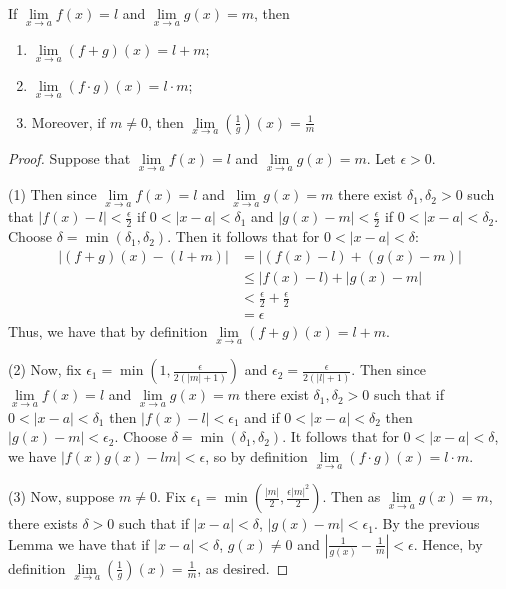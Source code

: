 \begin{thm}\label{thm:limlaws}
    If $\lim\limits_{x\rightarrow a}f(x) = l$ and $\lim\limits_{x\rightarrow a}g(x) = m$, then \begin{enumerate}
        \item $\lim\limits_{x\rightarrow a}(f+g)(x) = l+m$;
        \item $\lim\limits_{x\rightarrow a}(f\cdot g)(x) = l\cdot m$;
        \item Moreover, if $m \neq 0$, then $\lim\limits_{x\rightarrow a}\left(\frac{1}{g}\right)(x) = \frac{1}{m}$
    \end{enumerate}
\end{thm}
\begin{proof}
    Suppose that $\lim\limits_{x\rightarrow a}f(x) = l$ and $\lim\limits_{x\rightarrow a}g(x) = m$. Let $\epsilon > 0$.


    (1) Then since $\lim\limits_{x\rightarrow a}f(x) = l$ and $\lim\limits_{x\rightarrow a}g(x) = m$ there exist $\delta_1,\delta_2 > 0$ such that $|f(x) - l| < \frac{\epsilon}{2}$ if $0 < |x-a| < \delta_1$ and $|g(x) - m| < \frac{\epsilon}{2}$ if $0 < |x-a| < \delta_2$. Choose $\delta = \min(\delta_1,\delta_2)$. Then it follows that for $0 < |x-a| < \delta$: \begin{align*}
        |(f+g)(x) - (l+m)| &= |(f(x) - l) + (g(x) - m)| \\
        &\leq |f(x) - l) + |g(x) - m| \\
        &< \frac{\epsilon}{2} + \frac{\epsilon}{2} \\
        &= \epsilon
    \end{align*}
    Thus, we have that by definition $\lim\limits_{x\rightarrow a}(f+g)(x) = l+m$.


    (2) Now, fix $\epsilon_1 = \min\left(1,\frac{\epsilon}{2(|m|+1)}\right)$ and $\epsilon_2 = \frac{\epsilon}{2(|l| + 1)}$. Then since $\lim\limits_{x\rightarrow a}f(x) = l$ and $\lim\limits_{x\rightarrow a}g(x) = m$ there exist $\delta_1, \delta_2> 0$ such that if $0<|x-a| < \delta_1$ then $|f(x) - l| < \epsilon_1$ and if $0<|x-a| < \delta_2$ then $|g(x) - m| < \epsilon_2$. Choose $\delta = \min(\delta_1,\delta_2)$. It follows that for $0<|x-a| < \delta$, we have $|f(x)g(x) - lm| < \epsilon$, so by definition $\lim\limits_{x\rightarrow a}(f\cdot g)(x) = l\cdot m$.



    (3) Now, suppose $m \neq 0$. Fix $\epsilon_1 = \min\left(\frac{|m|}{2},\frac{\epsilon|m|^2}{2}\right)$. Then as $\lim\limits_{x\rightarrow a}g(x) = m$, there exists $\delta > 0$ such that if $|x-a| < \delta$, $|g(x) - m| < \epsilon_1$. By the previous Lemma we have that if $|x-a| < \delta$, $g(x) \neq 0$ and $\left|\frac{1}{g(x)} - \frac{1}{m}\right| < \epsilon$. Hence, by definition $\lim\limits_{x\rightarrow a}\left(\frac{1}{g}\right)(x) = \frac{1}{m}$, as desired.
\end{proof}


